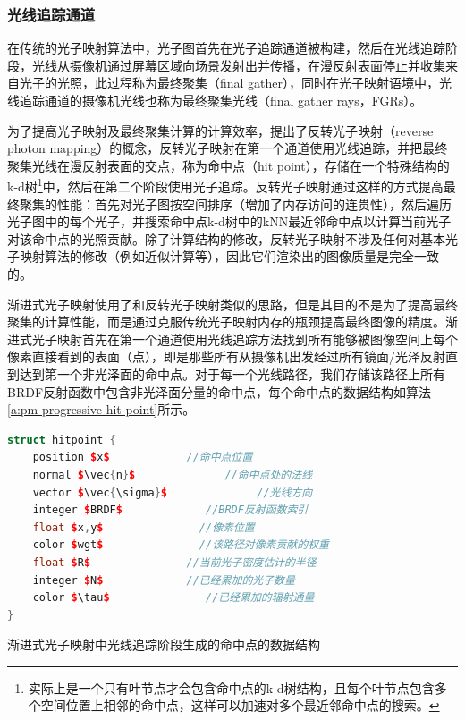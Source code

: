 \subsubsection{光线追踪通道}
在传统的光子映射算法中，光子图首先在光子追踪通道被构建，然后在光线追踪阶段，光线从摄像机通过屏幕区域向场景发射出并传播，在漫反射表面停止并收集来自光子的光照，此过程称为最终聚集（final gather），同时在光子映射语境中，光线追踪通道的摄像机光线也称为最终聚集光线（final gather rays，FGRs）。

为了提高光子映射及最终聚集计算的计算效率，\cite{a:FastFinalGatheringviaReversePhotonMapping}提出了反转光子映射（reverse photon mapping）的概念，反转光子映射在第一个通道使用光线追踪，并把最终聚集光线在漫反射表面的交点，称为命中点（hit point），存储在一个特殊结构的k-d树\footnote{实际上是一个只有叶节点才会包含命中点的k-d树结构，且每个叶节点包含多个空间位置上相邻的命中点，这样可以加速对多个最近邻命中点的搜索。}中，然后在第二个阶段使用光子追踪。反转光子映射通过这样的方式提高最终聚集的性能：首先对光子图按空间排序（增加了内存访问的连贯性），然后遍历光子图中的每个光子，并搜索命中点k-d树中的kNN最近邻命中点以计算当前光子对该命中点的光照贡献。除了计算结构的修改，反转光子映射不涉及任何对基本光子映射算法的修改（例如近似计算等），因此它们渲染出的图像质量是完全一致的。

渐进式光子映射使用了和反转光子映射类似的思路，但是其目的不是为了提高最终聚集的计算性能，而是通过克服传统光子映射内存的瓶颈提高最终图像的精度。渐进式光子映射首先在第一个通道使用光线追踪方法找到所有能够被图像空间上每个像素直接看到的表面（点），即是那些所有从摄像机出发经过所有镜面/光泽反射直到达到第一个非光泽面的命中点。对于每一个光线路径，我们存储该路径上所有BRDF反射函数中包含非光泽面分量的命中点，每个命中点的数据结构如算法\ref{a:pm-progressive-hit-point}所示。

\begin{algorithm}
\begin{lstlisting}[language=C++, mathescape]
struct hitpoint {
	position $x$            //命中点位置
	normal $\vec{n}$              //命中点处的法线
	vector $\vec{\sigma}$              //光线方向
	integer $BRDF$             //BRDF反射函数索引
	float $x,y$               //像素位置
	color $wgt$               //该路径对像素贡献的权重
	float $R$               //当前光子密度估计的半径 
	integer $N$             //已经累加的光子数量 
	color $\tau$               //已经累加的辐射通量
}
\end{lstlisting}	
\caption{渐进式光子映射中光线追踪阶段生成的命中点的数据结构}
\label{a:pm-progressive-hit-point}
\end{algorithm}

